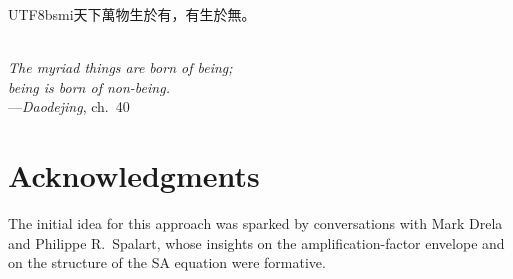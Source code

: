 \documentclass[journal]{new-aiaa}
\begin{document}
\begin{center}
  \begin{minipage}{0.6\textwidth}\centering
  \begin{CJK}{UTF8}{bsmi}天下萬物生於有，有生於無。\end{CJK}\\[3pt]
  \emph{The myriad things are born of being;\\
  being is born of non-being.}\\[3pt]
  ---\emph{Daodejing}, ch.~40
  \end{minipage}
\end{center}

\section*{Acknowledgments}
The initial idea for this approach was sparked by conversations with Mark Drela
and Philippe R.\ Spalart, whose insights on the amplification-factor envelope
and on the structure of the SA equation were formative.


\end{document}
